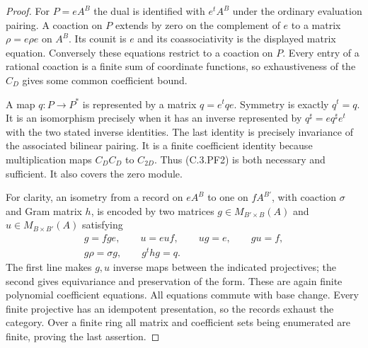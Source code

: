 \begin{proof}
For $P=eA^B$ the dual is identified with $e^tA^B$
under the ordinary evaluation pairing.
A coaction on $P$ extends by zero on the complement
of $e$ to a matrix $\rho=e\rho e$ on $A^B$.
Its counit is $e$ and its coassociativity is the
displayed matrix equation. Conversely these
equations restrict to a coaction on $P$.
Every entry of a rational coaction is a finite sum
of coordinate functions, so exhaustiveness of
the $C_D$ gives some common coefficient bound.

A map $q:P\to P^*$ is represented by a matrix
$q=e^tqe$. Symmetry is exactly $q^t=q$.
It is an isomorphism precisely when it has an
inverse represented by $q^\sharp=e q^\sharp e^t$
with the two stated inverse identities.
The last identity is precisely invariance of the
associated bilinear pairing. It is a finite
coefficient identity because multiplication maps
$C_D C_D$ to $C_{2D}$.
Thus (C.3.PF2) is both necessary and sufficient.
It also covers the zero module.

For clarity, an isometry from a record on $eA^B$
to one on $fA^{B'}$, with coaction $\sigma$ and
Gram matrix $h$, is encoded by two matrices
$g\in M_{B'\times B}(A)$ and
$u\in M_{B\times B'}(A)$ satisfying
\[
\begin{gathered}
 g=fge,\qquad u=euf,\qquad ug=e,\qquad gu=f,\\
                 g\rho=\sigma g,\qquad g^t h g=q .
\end{gathered}                                           \tag{C.3.PF3}
\]
The first line makes $g,u$ inverse maps between
the indicated projectives; the second gives
equivariance and preservation of the form.
These are again finite polynomial coefficient
equations. All equations commute with base change.
Every finite projective has an idempotent
presentation, so the records exhaust the category.
Over a finite ring all matrix and coefficient
sets being enumerated are finite, proving the
last assertion.
\end{proof}


